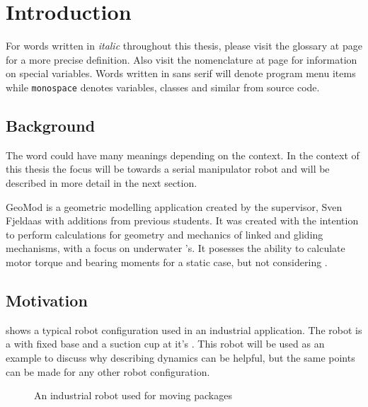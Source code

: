 \vspace{-1cm}
\chapter{Introduction}
\vspace{-1cm}
For words written in \textit{italic} throughout this thesis, please visit the glossary at page \pageref{glossary} for a more precise definition. Also visit the nomenclature at page \pageref{nomenclature} for information on special variables. Words written in \textsf{sans serif} will denote program menu items while \texttt{monospace} denotes variables, classes and similar from source code.

\vspace{-0.4cm}

\section{Background}

The word  could have many meanings depending on the context. In the context of this thesis the focus will be towards a serial manipulator robot and will be described in more detail in the next section.

GeoMod is a geometric modelling application created by the supervisor, Sven Fjeldaas with additions from previous students. It was created with the intention to perform calculations for geometry and mechanics of linked and gliding mechanisms, with a focus on underwater 's. It posesses the ability to calculate motor torque and bearing moments for a static case, but not considering .

\vspace{-0.4cm}

\section{Motivation}

 shows a typical robot configuration used in an industrial application. The robot is a  with fixed base and a suction cup at it's . This robot will be used as an example to discuss why describing dynamics can be helpful, but the same points can be made for any other robot configuration.

\begin{figure}[h!]    
    \centering           
    \def\svgwidth{.8\columnwidth}
    
    \caption{An industrial robot used for moving packages}
    \label{exampleCase}
\end{figure}

